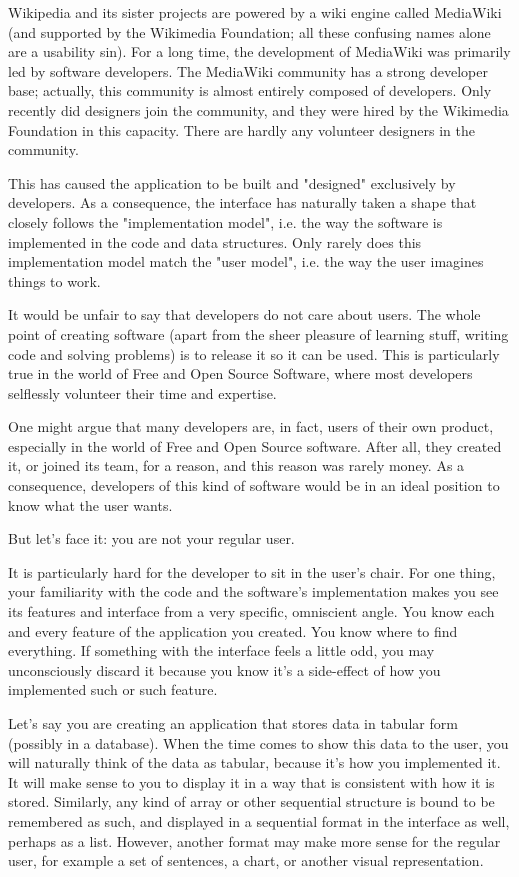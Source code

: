 Wikipedia and its sister projects are powered by a wiki engine called MediaWiki (and supported by the Wikimedia Foundation; all these confusing names alone are a usability sin). For a long time, the development of MediaWiki was primarily led by software developers. The MediaWiki community has a strong developer base; actually, this community is almost entirely composed of developers. Only recently did designers join the community, and they were hired by the Wikimedia Foundation in this capacity. There are hardly any volunteer designers in the community.

This has caused the application to be built and "designed" exclusively by developers. As a consequence, the interface has naturally taken a shape that closely follows the "implementation model", i.e. the way the software is implemented in the code and data structures. Only rarely does this implementation model match the "user model", i.e. the way the user imagines things to work.

It would be unfair to say that developers do not care about users. The whole point of creating software (apart from the sheer pleasure of learning stuff, writing code and solving problems) is to release it so it can be used. This is particularly true in the world of Free and Open Source Software, where most developers selflessly volunteer their time and expertise.

One might argue that many developers are, in fact, users of their own product, especially in the world of Free and Open Source software. After all, they created it, or joined its team, for a reason, and this reason was rarely money. As a consequence, developers of this kind of software would be in an ideal position to know what the user wants.

But let's face it: you are not your regular user.

It is particularly hard for the developer to sit in the user's chair. For one thing, your familiarity with the code and the software's implementation makes you see its features and interface from a very specific, omniscient angle. You know each and every feature of the application you created. You know where to find everything. If something with the interface feels a little odd, you may unconsciously discard it because you know it's a side-effect of how you implemented such or such feature.

Let's say you are creating an application that stores data in tabular form (possibly in a database). When the time comes to show this data to the user, you will naturally think of the data as tabular, because it's how you implemented it. It will make sense to you to display it in a way that is consistent with how it is stored. Similarly, any kind of array or other sequential structure is bound to be remembered as such, and displayed in a sequential format in the interface as well, perhaps as a list. However, another format may make more sense for the regular user, for example a set of sentences, a chart, or another visual representation.

